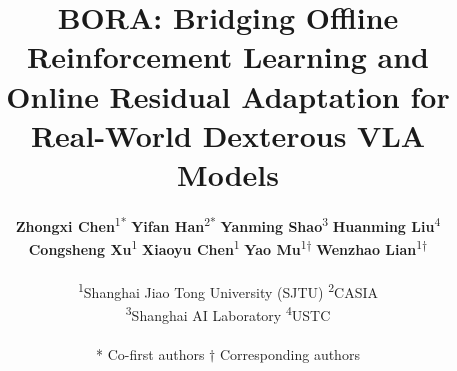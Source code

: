 \documentclass{article}
\title{BORA: Bridging Offline Reinforcement Learning and Online Residual Adaptation for Real-World Dexterous VLA Models}
\author{
  \textbf{Zhongxi Chen}\textsuperscript{1*}\quad 
  \textbf{Yifan Han}\textsuperscript{2*}\quad 
  \textbf{Yanming Shao}\textsuperscript{3}\quad 
  \textbf{Huanming Liu}\textsuperscript{4}\\
  \textbf{Congsheng Xu}\textsuperscript{1}\quad 
  \textbf{Xiaoyu Chen}\textsuperscript{1}\quad 
  \textbf{Yao Mu}\textsuperscript{1$\dagger$}\quad 
  \textbf{Wenzhao Lian}\textsuperscript{1$\dagger$} \\
  \\[0.2cm]
  \textsuperscript{1}Shanghai Jiao Tong University (SJTU) \quad \textsuperscript{2}CASIA \\
  \textsuperscript{3}Shanghai AI Laboratory \quad \textsuperscript{4}USTC \\
  \\[0.1cm]
  \small{* Co-first authors \quad $\dagger$ Corresponding authors}
}
\begin{document}
\maketitle
\raggedbottom

\end{document}
